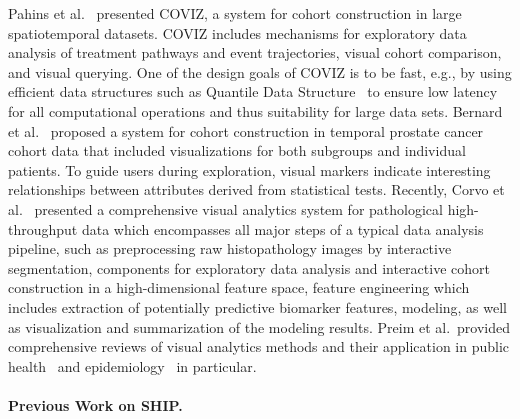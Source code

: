 \documentclass[
  oneside]{book}
\begin{document}
Pahins et al.~\autocite{Pahins:COVIZ2019} presented COVIZ, a system for cohort construction in large spatiotemporal datasets.
COVIZ includes mechanisms for exploratory data analysis of treatment pathways and event trajectories, visual cohort comparison, and visual querying.
One of the design goals of COVIZ is to be fast, e.g., by using efficient data structures such as Quantile Data Structure~\autocite{de2019real} to ensure low latency for all computational operations and thus suitability for large data sets.
Bernard et al.~\autocite{bernard2015visual} proposed a system for cohort construction in temporal prostate cancer cohort data that included visualizations for both subgroups and individual patients.
To guide users during exploration, visual markers indicate interesting relationships between attributes derived from statistical tests.
Recently, Corvo et al.~\autocite{Corvo2020} presented a comprehensive visual analytics system for pathological high-throughput data which encompasses all major steps of a typical data analysis pipeline, such as preprocessing raw histopathology images by interactive segmentation, components for exploratory data analysis and interactive cohort construction in a high-dimensional feature space, feature engineering which includes extraction of potentially predictive biomarker features, modeling, as well as visualization and summarization of the modeling results.
Preim et al.~provided comprehensive reviews of visual analytics methods and their application in public health~\autocite{preim2020survey} and epidemiology~\autocite{Preim16} in particular.

\paragraph*{Previous Work on SHIP.}
\end{document}
